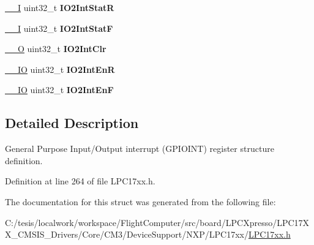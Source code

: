 \begin{DoxyCompactItemize}
\item 
\hypertarget{struct_l_p_c___g_p_i_o_i_n_t___type_def_a3ff6df7dfc2b6f87b8632eb91ba5f8ab}{\hyperlink{group___c_m_s_i_s__core__definitions_gaf63697ed9952cc71e1225efe205f6cd3}{\-\_\-\-\_\-\-I} uint32\-\_\-t {\bfseries \-I\-O2\-Int\-Stat\-R}}\label{struct_l_p_c___g_p_i_o_i_n_t___type_def_a3ff6df7dfc2b6f87b8632eb91ba5f8ab}

\item 
\hypertarget{struct_l_p_c___g_p_i_o_i_n_t___type_def_a47babfbe052441ddac928c91560e3606}{\hyperlink{group___c_m_s_i_s__core__definitions_gaf63697ed9952cc71e1225efe205f6cd3}{\-\_\-\-\_\-\-I} uint32\-\_\-t {\bfseries \-I\-O2\-Int\-Stat\-F}}\label{struct_l_p_c___g_p_i_o_i_n_t___type_def_a47babfbe052441ddac928c91560e3606}

\item 
\hypertarget{struct_l_p_c___g_p_i_o_i_n_t___type_def_a1ee47557eb72e360ac71633b72d510cb}{\hyperlink{group___c_m_s_i_s__core__definitions_ga7e25d9380f9ef903923964322e71f2f6}{\-\_\-\-\_\-\-O} uint32\-\_\-t {\bfseries \-I\-O2\-Int\-Clr}}\label{struct_l_p_c___g_p_i_o_i_n_t___type_def_a1ee47557eb72e360ac71633b72d510cb}

\item 
\hypertarget{struct_l_p_c___g_p_i_o_i_n_t___type_def_a3a443b7e903e36f890aad5b392cfe759}{\hyperlink{group___c_m_s_i_s__core__definitions_gaec43007d9998a0a0e01faede4133d6be}{\-\_\-\-\_\-\-I\-O} uint32\-\_\-t {\bfseries \-I\-O2\-Int\-En\-R}}\label{struct_l_p_c___g_p_i_o_i_n_t___type_def_a3a443b7e903e36f890aad5b392cfe759}

\item 
\hypertarget{struct_l_p_c___g_p_i_o_i_n_t___type_def_a6ec2f354e0d7e401afc4d783f21f321d}{\hyperlink{group___c_m_s_i_s__core__definitions_gaec43007d9998a0a0e01faede4133d6be}{\-\_\-\-\_\-\-I\-O} uint32\-\_\-t {\bfseries \-I\-O2\-Int\-En\-F}}\label{struct_l_p_c___g_p_i_o_i_n_t___type_def_a6ec2f354e0d7e401afc4d783f21f321d}

\end{DoxyCompactItemize}


\subsection{\-Detailed \-Description}
\-General \-Purpose \-Input/\-Output interrupt (\-G\-P\-I\-O\-I\-N\-T) register structure definition. 

\-Definition at line 264 of file \-L\-P\-C17xx.\-h.



\-The documentation for this struct was generated from the following file\-:\begin{DoxyCompactItemize}
\item 
\-C\-:/tesis/localwork/workspace/\-Flight\-Computer/src/board/\-L\-P\-C\-Xpresso/\-L\-P\-C17\-X\-X\-\_\-\-C\-M\-S\-I\-S\-\_\-\-Drivers/\-Core/\-C\-M3/\-Device\-Support/\-N\-X\-P/\-L\-P\-C17xx/\hyperlink{_l_p_c17xx_8h}{\-L\-P\-C17xx.\-h}\end{DoxyCompactItemize}
